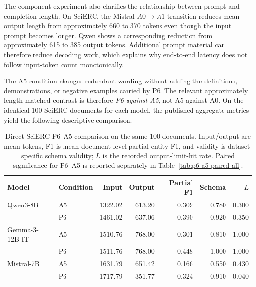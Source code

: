 \documentclass[fleqn,10pt]{wlscirep-authoryear}
\begin{document}
The component experiment also clarifies the relationship between prompt and
completion length. On SciERC, the Mistral $A0\rightarrow A1$ transition reduces
mean output length from approximately 660 to 370 tokens even though the input
prompt becomes longer. Qwen shows a corresponding reduction from approximately
615 to 385 output tokens. Additional prompt material can therefore reduce decoding
work, which explains why end-to-end latency does not follow input-token count
monotonically.

The A5 condition changes redundant wording without adding the definitions,
demonstrations, or negative examples carried by P6. The relevant
approximately length-matched contrast is therefore \emph{P6 against A5}, not
A5 against A0. On the identical 100 SciERC documents for each model, the
published aggregate metrics yield the following descriptive comparison.

\begin{table}[t]
\centering
\caption{Direct SciERC P6--A5 comparison on the same 100 documents. Input/output
are mean tokens, F1 is mean document-level partial entity F1, and validity is
dataset-specific schema validity; \(L\) is the recorded output-limit-hit rate.
Paired significance for P6--A5 is reported separately in Table~\ref{tab:p6-a5-paired-all}.}
\label{tab:p6-a5-direct}
\begin{tabular}{llrrrrr}
\toprule
Model & Condition & Input & Output & Partial F1 & Schema & $L$ \\
\midrule
Qwen3-8B & A5 & 1322.02 & 613.20 & 0.309 & 0.780 & 0.300 \\
          & P6 & 1461.02 & 637.06 & 0.390 & 0.920 & 0.350 \\
Gemma-3-12B-IT & A5 & 1510.76 & 768.00 & 0.301 & 0.810 & 1.000 \\
                 & P6 & 1511.76 & 768.00 & 0.448 & 1.000 & 1.000 \\
Mistral-7B & A5 & 1631.79 & 651.42 & 0.166 & 0.550 & 0.430 \\
           & P6 & 1717.79 & 351.77 & 0.324 & 0.910 & 0.040 \\
\bottomrule
\end{tabular}
\end{table}
\end{document}
